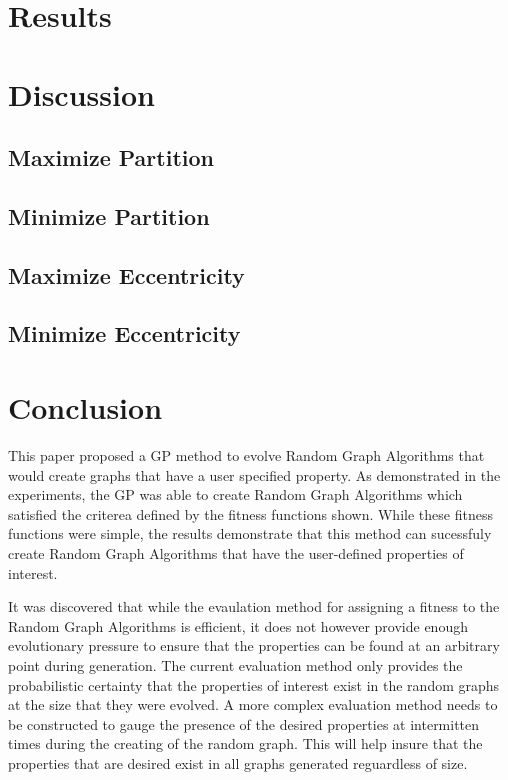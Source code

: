 \documentclass{article}
\begin{document}
\section{Results}

\section{Discussion}


\subsection{Maximize Partition}


\subsection{Minimize Partition}


\subsection{Maximize Eccentricity}


\subsection{Minimize Eccentricity}



\section{Conclusion}
This paper proposed a GP method to evolve Random Graph Algorithms that would create graphs that have a user specified property. As demonstrated
in the experiments, the GP was able to create Random Graph Algorithms which satisfied the criterea defined by the fitness functions shown. While these
fitness functions were simple, the results demonstrate that this method can sucessfuly create Random Graph Algorithms that have the user-defined 
properties of interest. 

It was discovered that while the evaulation method for assigning a fitness to the Random Graph Algorithms is efficient, it does not however provide
enough evolutionary pressure to ensure that the properties can be found at an arbitrary point during generation. The current evaluation method only 
provides the probabilistic certainty that the properties of interest exist in the random graphs at the size that they were evolved. A more complex evaluation
method needs to be constructed to gauge the presence of the desired properties at intermitten times during the creating of the random graph. This will
help insure that the properties that are desired exist in all graphs generated reguardless of size. 
\end{document}
